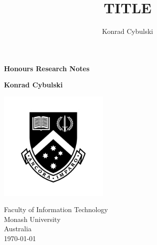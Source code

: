 \documentclass[10pt,a4paper]{article}
\author{Konrad Cybulski}
\title{TITLE}
\begin{document}
	
\begin{titlepage}
	\begin{center}
		\vspace*{1cm}
		
		\LARGE
		\textbf{Honours Research Notes}
		
		\vspace{2cm}
		\Large
		
		\textbf{Konrad Cybulski}
		
		\vfill
		
		\vspace{0.8cm}
		
		\includegraphics[width=0.4\textwidth]{images/monash_emblem.jpg}
		
		\large
		Faculty of Information Technology\\
		Monash University\\
		Australia\\
		\today
		
	\end{center}
\end{titlepage}

\pagebreak
\tableofcontents
\pagebreak
\end{document}
